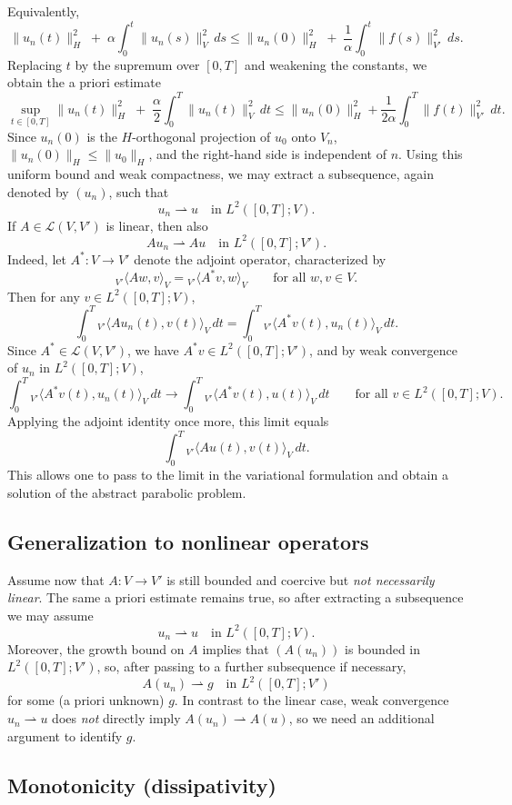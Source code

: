 \documentclass[11pt]{article}
\theoremstyle{definition}
\theoremstyle{remark}
\newcommand{\dual}[2]{{}_{V'}\langle #1, #2 \rangle_{V}}
\begin{document}
Equivalently,
\[
\|u_n(t)\|_H^2
\;+\;
\alpha\int_0^t\|u_n(s)\|_V^2\,ds
\le
\|u_n(0)\|_H^2
\;+\;
\frac{1}{\alpha}\int_0^t\|f(s)\|_{V'}^2\,ds.
\]
Replacing $t$ by the supremum over $[0,T]$ and weakening the constants, we obtain the a priori estimate
\[
\sup_{t\in[0,T]}\|u_n(t)\|_H^2
\;+\;
\frac{\alpha}{2}\int_0^T\|u_n(t)\|_V^2\,dt
\le
\|u_n(0)\|_H^2 + \frac{1}{2\alpha}\int_0^T\|f(t)\|_{V'}^2\,dt.
\]
Since $u_n(0)$ is the $H$-orthogonal projection of $u_0$ onto $V_n$, $\|u_n(0)\|_H\le \|u_0\|_H$, and the right-hand side is independent of $n$.
Using this uniform bound and weak compactness, we may extract a subsequence, again denoted by
$(u_n)$, such that
\[
u_n\rightharpoonup u \quad \text{in } L^2([0,T];V).
\]
If $A\in\mathcal{L}(V,V')$ is linear, then also
\[
A u_n \rightharpoonup A u \quad \text{in } L^2([0,T];V').
\]
Indeed, let $A^*:V\to V'$ denote the adjoint operator, characterized by
\[
\dual{Aw}{v}=\dual{A^*v}{w}
\qquad\text{for all }w,v\in V.
\]
Then for any $v\in L^2([0,T];V)$,
\[
\int_0^T \dual{Au_n(t)}{v(t)}\,dt
=
\int_0^T \dual{A^*v(t)}{u_n(t)}\,dt.
\]
Since $A^*\in\mathcal{L}(V,V')$, we have $A^*v\in L^2([0,T];V')$, and by weak convergence of
$u_n$ in $L^2([0,T];V)$,
\[
\int_0^T \dual{A^*v(t)}{u_n(t)}\,dt
\longrightarrow
\int_0^T \dual{A^*v(t)}{u(t)}\,dt
\qquad\text{for all }v\in L^2([0,T];V).
\]
Applying the adjoint identity once more, this limit equals
\[
\int_0^T \dual{Au(t)}{v(t)}\,dt.
\]
This allows one to pass to the limit in the variational formulation and obtain a solution of the
abstract parabolic problem.

\subsection*{Generalization to nonlinear operators}

Assume now that $A:V\to V'$ is still bounded and coercive but \emph{not necessarily linear}.
The same a priori estimate remains true, so after extracting a subsequence we may assume
\[
u_n \rightharpoonup u \quad \text{in } L^2([0,T];V).
\]
Moreover, the growth bound on $A$ implies that $(A(u_n))$ is bounded in $L^2([0,T];V')$, so,
after passing to a further subsequence if necessary,
\[
A(u_n) \rightharpoonup g \quad \text{in } L^2([0,T];V')
\]
for some (a priori unknown) $g$.
In contrast to the linear case, weak convergence $u_n\rightharpoonup u$ does \emph{not} directly imply
$A(u_n)\rightharpoonup A(u)$, so we need an additional argument to identify $g$.

\subsection*{Monotonicity (dissipativity)}
\end{document}
